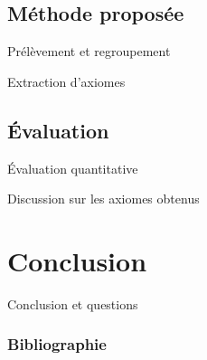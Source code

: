 \documentclass{beamer}
\begin{document}
\subsection{Méthode proposée}

\begin{frame}{Prélèvement et regroupement}
    
\end{frame}

\begin{frame}{Extraction d'axiomes}
    
\end{frame}

\subsection{Évaluation}
\begin{frame}{Évaluation quantitative}
    
\end{frame}

\begin{frame}{Discussion sur les axiomes obtenus}
    
\end{frame}

\section{Conclusion}

\begin{frame}{Conclusion et questions}


\end{frame}

\begin{frame}
        \frametitle{Bibliographie}
        
        
\end{frame}
\end{document}
